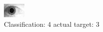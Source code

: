 \begin{figure}[h!]
\begin{center}
\includegraphics[width=0.60\columnwidth]{figures/ID1961_class_4_target_3.png}
\end{center}
\caption{ Classification: 4 actual target: 3}
\label{fig:ID1961_class_4_target_3}
\end{figure}
